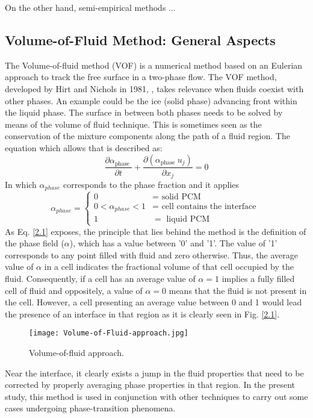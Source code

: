 On the other hand, semi-empirical methods ...
\subsection{Volume-of-Fluid Method: General Aspects}
The Volume-of-fluid method (VOF) is a numerical method based on an Eulerian approach to track the free surface in a two-phase flow.
The VOF method, developed by Hirt and Nichols in 1981, \cite{hirt_nichols_1981}, takes relevance when fluids coexist with other phases. An example could be the ice (solid phase) advancing front within the liquid phase. The surface in between both phases needs to be solved by means of the volume of fluid technique.
\newline
This is sometimes seen as the conservation of the mixture components along the path of a fluid region. The equation which allows that is described as:
\begin{equation}
	\frac{\partial \alpha_{\text {phase }}}{\partial t}+\frac{\partial\left(\alpha_{\text {phase }} u_{j}\right)}{\partial x_{j}}=0
	\label{2.1}
\end{equation}
In which $\alpha_{phase}$ corresponds to the phase fraction and it applies
\begin{equation}
	\alpha_{phase}= \begin{cases}
		0 & =\text { solid PCM } \\ 0<\alpha_{phase}<1 & =\text { cell contains the interface } \\ 1 & =\text { liquid } \mathrm{PCM}
	\end{cases}
	\label{2.2}
\end{equation}
\clearpage
As Eq. \ref{2.1} exposes, the principle that lies behind the method is the definition of the phase field ($\alpha$), which has a value between '0' and '1'. The value of '1' corresponds to any point filled with fluid and zero otherwise. Thus, the average value of $\alpha$	in a cell indicates the fractional volume of that cell occupied by the fluid. Consequently, if a cell has an average value of $\alpha=1$ implies a fully filled cell of fluid and oppositely, a value of $\alpha=0$ means that the fluid is not present in the cell. However, a cell presenting an average value between 0 and 1 would lead the presence of an interface in that region as it is clearly seen in Fig. \ref{2.1}.
\begin{figure}[h!]
	\centering
	\texttt{[image: Volume-of-Fluid-approach.jpg]}	
	\label{2.1fig}
	\caption{Volume-of-fluid approach.}
\end{figure} 
Near the interface, it clearly exists a jump in the fluid properties that need to be corrected by properly averaging phase properties in that region.
\newline
In the present study, this method is used in conjunction with other techniques to carry out some cases undergoing phase-transition phenomena.
